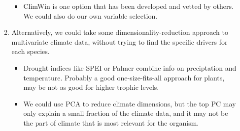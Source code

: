 \documentclass{article}
\begin{document}
\begin{enumerate}
\begin{enumerate}
\begin{itemize}
\item{ClimWin is one option that has been developed and vetted by others. We could also do our own variable selection.}
\end{itemize}
\item{Alternatively, we could take some dimensionality-reduction approach to multivariate climate data, without trying to find the specific drivers for each species.}
\begin{itemize}
\item{Drought indices like SPEI or Palmer combine info on preciptation and temperature. Probably a good one-size-fits-all approach for plants, may be not as good for higher trophic levels.}
\item{We could use PCA to reduce climate dimensions, but the top PC may only explain a small fraction of the climate data, and it may not be the part of climate that is most relevant for the organism.}
\end{itemize}
\end{enumerate}
\end{enumerate}
\end{document}
